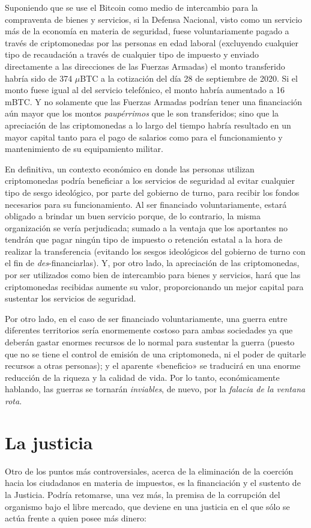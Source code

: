\documentclass[12pt,a4paper,twoside]{book}
\begin{document}
Suponiendo que se use el Bitcoin como medio de intercambio para la compraventa de bienes y servicios, si la Defensa Nacional, visto como un servicio más de la economía en materia de seguridad, fuese voluntariamente pagado a través de criptomonedas por las personas en edad laboral (excluyendo cualquier tipo de recaudación a través de cualquier tipo de impuesto y enviado directamente a las direcciones de las Fuerzas Armadas) el monto transferido habría sido de 374 $ \mu $BTC a la cotización del día 28 de septiembre de 2020. Si el monto fuese igual al del servicio telefónico, el monto habría aumentado a 16 mBTC. Y no solamente que las Fuerzas Armadas podrían tener una financiación aún mayor que los montos \textit{paupérrimos} que le son transferidos; sino que la apreciación de las criptomonedas a lo largo del tiempo habría resultado en un mayor capital tanto para el pago de salarios como para el funcionamiento y mantenimiento de su equipamiento militar.

En definitiva, un contexto económico en donde las personas utilizan criptomonedas podría beneficiar a los servicios de seguridad al evitar cualquier tipo de sesgo ideológico, por parte del gobierno de turno, para recibir los fondos necesarios para su funcionamiento. Al ser financiado voluntariamente, estará obligado a brindar un buen servicio porque, de lo contrario, la misma organización se vería perjudicada; sumado a la ventaja que los aportantes no tendrán que pagar ningún tipo de impuesto o retención estatal a la hora de realizar la transferencia (evitando los sesgos ideológicos del gobierno de turno con el fin de \textit{des}-financiarlas). Y, por otro lado, la apreciación de las criptomonedas, por ser utilizados como bien de intercambio para bienes y servicios, hará que las criptomonedas recibidas aumente su valor, proporcionando un mejor capital para sustentar los servicios de seguridad.

Por otro lado, en el caso de ser financiado voluntariamente, una guerra entre diferentes territorios sería enormemente costoso para ambas sociedades ya que deberán gastar enormes recursos de lo normal para sustentar la guerra (puesto que no se tiene el control de emisión de una criptomoneda, ni el poder de quitarle recursos a otras personas); y el aparente «beneficio» se traducirá en una enorme reducción de la riqueza y la calidad de vida. Por lo tanto, económicamente hablando, las guerras se tornarán \textit{inviables}, de nuevo, por la \textit{falacia de la ventana rota}.

\section{La justicia}
Otro de los puntos más controversiales, acerca de la eliminación de la coerción hacia los ciudadanos en materia de impuestos, es la financiación y el sustento de la Justicia. Podría retomarse, una vez más, la premisa de la corrupción del organismo bajo el libre mercado, que deviene en una justicia en el que sólo se actúa frente a quien posee más dinero: 
\end{document}
